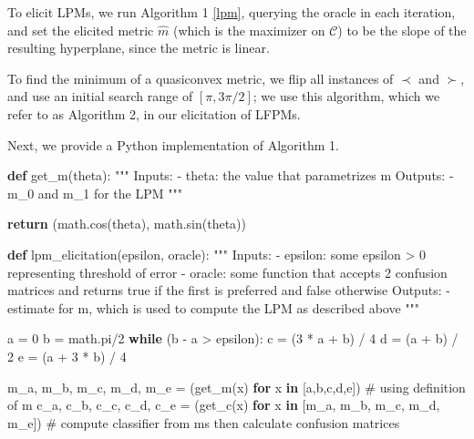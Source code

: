 \documentclass[
  letterpaper,
  numbers=noenddot,
  DIV=11,
  oneside]{scrreprt}
\newenvironment{Shaded}{\begin{snugshade}}{\end{snugshade}}
\newcommand{\CommentTok}[1]{\textcolor[rgb]{0.37,0.37,0.37}{#1}}
\newcommand{\ControlFlowTok}[1]{\textcolor[rgb]{0.00,0.23,0.31}{\textbf{#1}}}
\newcommand{\DecValTok}[1]{\textcolor[rgb]{0.68,0.00,0.00}{#1}}
\newcommand{\KeywordTok}[1]{\textcolor[rgb]{0.00,0.23,0.31}{\textbf{#1}}}
\newcommand{\NormalTok}[1]{\textcolor[rgb]{0.00,0.23,0.31}{#1}}
\newcommand{\OperatorTok}[1]{\textcolor[rgb]{0.37,0.37,0.37}{#1}}
\theoremstyle{remark}
\begin{document}
To elicit LPMs, we run Algorithm 1 \hyperref[lpm]{{[}lpm{]}}, querying
the oracle in each iteration, and set the elicited metric \(\hat{m}\)
(which is the maximizer on \(\mathcal{C}\)) to be the slope of the
resulting hyperplane, since the metric is linear.

To find the minimum of a quasiconvex metric, we flip all instances of
\(\prec\) and \(\succ\), and use an initial search range of
\([\pi, 3\pi/2]\); we use this algorithm, which we refer to as Algorithm
2, in our elicitation of LFPMs.

Next, we provide a Python implementation of Algorithm 1.

\begin{Shaded}
\begin{Highlighting}[numbers=left,,]
\KeywordTok{def}\NormalTok{ get\_m(theta):}
    \CommentTok{"""}
\CommentTok{    Inputs: }
\CommentTok{    {-} theta: the value that parametrizes m}
\CommentTok{    Outputs:}
\CommentTok{    {-} m\_0 and m\_1 for the LPM}
\CommentTok{    """}

    \ControlFlowTok{return}\NormalTok{ (math.cos(theta), math.sin(theta))}

\KeywordTok{def}\NormalTok{ lpm\_elicitation(epsilon, oracle):}
    \CommentTok{"""}
\CommentTok{    Inputs:}
\CommentTok{    {-} epsilon: some epsilon \textgreater{} 0 representing threshold of error}
\CommentTok{    {-} oracle: some function that accepts 2 confusion matrices and}
\CommentTok{        returns true if the first is preferred and false otherwise}
\CommentTok{    Outputs:}
\CommentTok{    {-} estimate for m, which is used to compute the LPM as described above}
\CommentTok{    """}

\NormalTok{    a }\OperatorTok{=} \DecValTok{0}
\NormalTok{    b }\OperatorTok{=}\NormalTok{ math.pi}\OperatorTok{/}\DecValTok{2}
    \ControlFlowTok{while}\NormalTok{ (b }\OperatorTok{{-}}\NormalTok{ a }\OperatorTok{\textgreater{}}\NormalTok{ epsilon):}
\NormalTok{        c }\OperatorTok{=}\NormalTok{ (}\DecValTok{3} \OperatorTok{*}\NormalTok{ a }\OperatorTok{+}\NormalTok{ b) }\OperatorTok{/} \DecValTok{4}
\NormalTok{        d }\OperatorTok{=}\NormalTok{ (a }\OperatorTok{+}\NormalTok{ b) }\OperatorTok{/} \DecValTok{2}
\NormalTok{        e }\OperatorTok{=}\NormalTok{ (a }\OperatorTok{+} \DecValTok{3} \OperatorTok{*}\NormalTok{ b) }\OperatorTok{/} \DecValTok{4}

\NormalTok{        m\_a, m\_b, m\_c, m\_d, m\_e }\OperatorTok{=}\NormalTok{ (get\_m(x) }\ControlFlowTok{for}\NormalTok{ x }\KeywordTok{in}\NormalTok{ [a,b,c,d,e]) }\CommentTok{\# using definition of m}
\NormalTok{        c\_a, c\_b, c\_c, c\_d, c\_e }\OperatorTok{=}\NormalTok{ (get\_c(x) }\ControlFlowTok{for}\NormalTok{ x }\KeywordTok{in}\NormalTok{ [m\_a, m\_b, m\_c, m\_d, m\_e]) }\CommentTok{\# compute classifier from m\textquotesingle{}s then calculate confusion matrices}
        

\end{Highlighting}
\end{Shaded}
\end{document}
